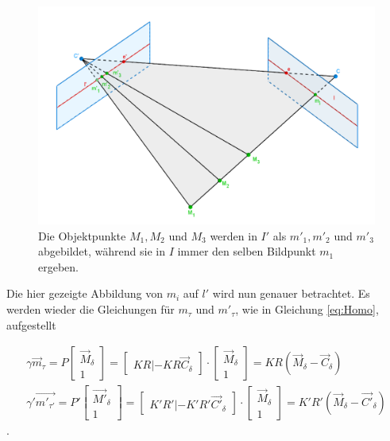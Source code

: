 \begin{figure}[!htb]
	\centering
	\includegraphics[width=.8\linewidth]{images/EpipolarLinien.png}
	\caption[Abbildungsvorschrift]{Die Objektpunkte $M_1, M_2$ und $M_3$ werden in $I'$ als $m'_1, m'_2$ und $m'_3$ abgebildet, während sie in $I$ immer den selben Bildpunkt $m_1$ ergeben.}  
	\label{fig:Epipolarconstraint}
\end{figure}


Die hier gezeigte Abbildung von $m_i$ auf $l'$ wird nun genauer betrachtet. Es werden wieder die Gleichungen für $m_\tau$ und $m'_\tau$, wie in Gleichung \ref{eq:Homo}, aufgestellt    

\begin{gather}
	\gamma \overrightarrow{m}_\tau = P \begin{bmatrix}\overrightarrow{M}_\delta\\1\end{bmatrix} = 
	\begin{bmatrix}KR|-KR\overrightarrow{C}_\delta\end{bmatrix}\cdot \begin{bmatrix}\overrightarrow{M}_\delta\\1\end{bmatrix} = KR(\overrightarrow{M}_\delta - \overrightarrow{C}_\delta) \label{eq:Ep1} \\
	\gamma' \overrightarrow{m'_{\tau'}} = P' \begin{bmatrix}\overrightarrow{M'}_\delta\\1\end{bmatrix} = 
	\begin{bmatrix}K'R'|-K'R'\overrightarrow{C'}_\delta\end{bmatrix}\cdot \begin{bmatrix}\overrightarrow{M}_\delta\\1\end{bmatrix} = K'R'(\overrightarrow{M}_\delta - \overrightarrow{C'}_\delta)\label{eq:Ep2}
\end{gather}.


